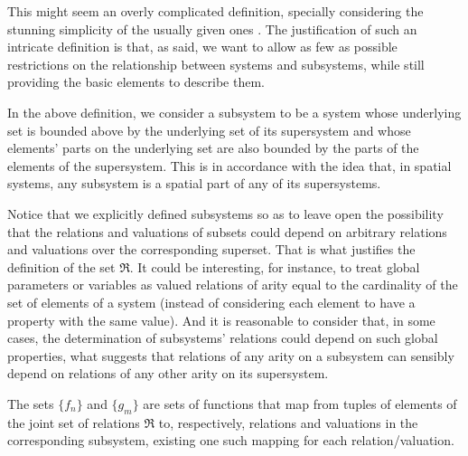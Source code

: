 \begin{remark} \label{rem::functional_dep}
This might seem an overly complicated definition, specially considering the stunning simplicity of the usually given ones \cite{Backlund2000,Mesarovic1970,Mesarovic1976}. The justification of such an intricate definition is that, as said, we want to allow as few as possible restrictions on the relationship between systems and subsystems, while still providing the basic elements to describe them.

In the above definition, we consider a subsystem to be a system whose underlying set is bounded above by the underlying set of its supersystem and whose elements' parts on the underlying set are also bounded by the parts of the elements of the supersystem. This is in accordance with the idea that, in spatial systems, any subsystem is a spatial part of any of its supersystems. 

Notice that we explicitly defined subsystems so as to leave open the possibility that the relations and valuations of subsets could depend on arbitrary relations and valuations over the corresponding superset. That is what justifies the definition of the set $\mathfrak{R}$. It could be interesting, for instance, to treat global parameters or variables as valued relations of arity equal to the cardinality of the set of elements of a system (instead of considering each element to have a property with the same value). And it is reasonable to consider that, in some cases, the determination of subsystems' relations could depend on such global properties, what suggests that relations of any arity on a subsystem can sensibly depend on relations of any other arity on its supersystem. 

The sets $\{f_n\}$ and $\{g_m\}$ are sets of functions that map from tuples of elements of the joint set of relations $\mathfrak{R}$ to, respectively, relations and valuations in the corresponding subsystem, existing one such mapping for each relation/valuation. 
\end{remark}

